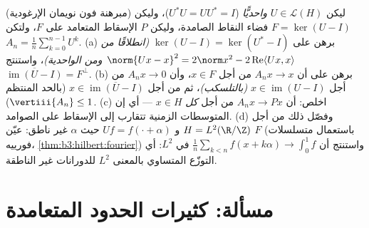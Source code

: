 \begin{exercise}[$\star\star\star$]\label{exo:b3:hilbert:12}
(مبرهنة فون نويمان الإرغودية) ليكن $U \in \mathcal L(H)$ \emph{واحديًّا}
($U^*U = UU^* = I$)، وليكن $F = \ker(U - I)$ فضاء النقاط الصامدة، وليكن $P$ الإسقاط
المتعامد على $F$، ولتكن $A_n = \frac1n\sum_{k=0}^{n-1}U^k$.
(a) برهن على $\ker(U - I) = \ker(U^* - I)$ \emph{(انطلاقًا من $\norm{Ux - x}^2 = 2\norm x^2 - 2\operatorname{Re}\langle
Ux, x\rangle$ ومن الواحدية)}،
واستنتج $\overline{\operatorname{im}(U - I)} = F^\perp$.
(b) برهن على أن $A_nx \to x$ من أجل $x \in F$، وأن
$A_nx \to 0$ من أجل $x \in \operatorname{im}(U - I)$ \emph{(بالتلسكب)}، ثم من أجل
$x \in \overline{\operatorname{im}(U - I)}$ (بالحد المنتظم $\vertiii{A_n} \leq 1$).
(c) اخلص: أن $A_nx \to Px$ من أجل \emph{كل} $x \in H$ --- أي
إن المتوسطات الزمنية تتقارب إلى الإسقاط على الصوامد.
(d) وفصّل ذلك من أجل $H = L^2(\R/\Z)$ و $Uf = f(\cdot +
\alpha)$ حيث $\alpha$
غير ناطق: عيّن $F$ (باستعمال متسلسلات فورييه، \cref{thm:b3:hilbert:fourier})
واستنتج أن $\frac1n\sum_{k<n}f(x + k\alpha) \to \int_0^1f$ في $L^2$: أي التوزّع المتساوي بالمعنى $L^2$
للدورانات غير الناطقة.
\end{exercise}

\section{مسألة: كثيرات الحدود المتعامدة}

